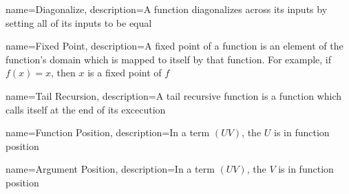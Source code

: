 {
        name={Diagonalize},
        description={A function diagonalizes across its inputs by setting all of its inputs to be equal}
}

{
        name={Fixed Point},
        description={A fixed point of a function is an element of the function's domain which is mapped to itself by that function. For example, if $f(x) = x$, then $x$ is a fixed point of $f$}
}

{
        name={Tail Recursion},
        description={A tail recursive function is a function which calls itself at the end of its excecution}
}

{
        name={Function Position},
        description={In a term $(UV)$, the $U$ is in function position}
}

{
        name={Argument Position},
        description={In a term $(UV)$, the $V$ is in function position}
}